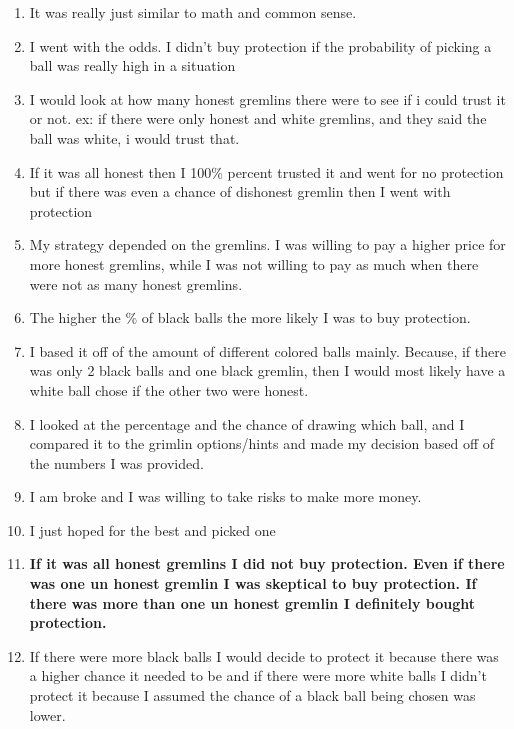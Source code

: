 \documentclass[12pt,a4paper]{article}
\begin{document}
\begin{appendices}
\begin{enumerate}
\item It was really just similar to math and common sense.

\item I went with the odds. I didn't buy protection if the probability of picking a ball was really high in a situation

\item I would look at how many honest gremlins there were to see if i could trust it or not. ex: if there were only honest and white gremlins, and they said the ball was white, i would trust that.

\item If it was all honest then I 100\% percent trusted it and went for no protection but if there was even a chance of dishonest gremlin then I went with protection

\item My strategy depended on the gremlins. I was willing to pay a higher price for more honest gremlins, while I was not willing to pay as much when there were not as many honest gremlins.

\item The higher the \% of black balls the more likely I was to buy protection.

\item I based it off of the amount of different colored balls mainly. Because, if there was only 2 black balls and one black gremlin, then I would most likely have a white ball chose if the other two were honest.

\item I looked at the percentage and the chance of drawing which ball, and I compared it to the grimlin options/hints and made my decision based off of the numbers I was provided.

\item I am broke and I was willing to take risks to make more money.

\item I just hoped for the best and picked one

\item \textbf{If it was all honest gremlins I did not buy protection. Even if there was one un honest gremlin I was skeptical to buy protection. If there was more than one un honest gremlin I definitely bought protection.}

\item If there were more black balls I would decide to protect it because there was a higher chance it needed to be and if there were more white balls I didn't protect it because I assumed the chance of a black ball being chosen was lower.


\end{enumerate}
\end{appendices}
\end{document}
